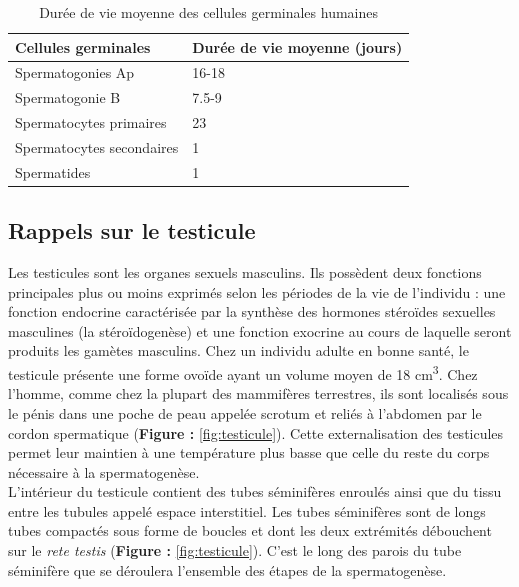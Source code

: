 \documentclass[12pt,twoside]{reedthesis}
\theoremstyle{definition}
\theoremstyle{definition}
\theoremstyle{remark}
\begin{document}
  \begin{longtable}[t]{ll}
  \caption{\label{tab:spermatotime}Durée de vie moyenne des cellules germinales humaines}\\
  \toprule
  Cellules germinales & Durée de vie moyenne (jours)\\
  \midrule
  Spermatogonies Ap & 16-18\\
  Spermatogonie B & 7.5-9\\
  Spermatocytes primaires & 23\\
  Spermatocytes secondaires & 1\\
  Spermatides & 1\\
  \bottomrule
  \end{longtable}
  
  \newpage
  
  \subsection{Rappels sur le testicule}\label{rappels-sur-le-testicule}
  
  Les testicules sont les organes sexuels masculins. Ils possèdent deux
  fonctions principales plus ou moins exprimés selon les périodes de la
  vie de l'individu : une fonction endocrine caractérisée par la synthèse
  des hormones stéroïdes sexuelles masculines (la stéroïdogenèse) et une
  fonction exocrine au cours de laquelle seront produits les gamètes
  masculins. Chez un individu adulte en bonne santé, le testicule présente
  une forme ovoïde ayant un volume moyen de 18 cm\textsuperscript{3}. Chez
  l'homme, comme chez la plupart des mammifères terrestres, ils sont
  localisés sous le pénis dans une poche de peau appelée scrotum et reliés
  à l'abdomen par le cordon spermatique (\textbf{Figure :}
  \ref{fig:testicule}). Cette externalisation des testicules permet leur
  maintien à une température plus basse que celle du reste du corps
  nécessaire à la spermatogenèse.\\
  L'intérieur du testicule contient des tubes séminifères enroulés ainsi
  que du tissu entre les tubules appelé espace interstitiel. Les tubes
  séminifères sont de longs tubes compactés sous forme de boucles et dont
  les deux extrémités débouchent sur le \emph{rete testis} (\textbf{Figure
  :} \ref{fig:testicule}). C'est le long des parois du tube séminifère que
  se déroulera l'ensemble des étapes de la spermatogenèse.
  
\end{document}

